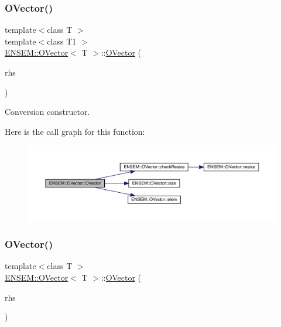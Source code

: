 \mbox{\label{classENSEM_1_1OVector_a1d68ef86b31297a79368789f7a0e43bc}} 
\subsubsection{\texorpdfstring{OVector()}{OVector()}\hspace{0.1cm}{\footnotesize\ttfamily [2/6]}}
{\footnotesize\ttfamily template$<$class T $>$ \\
template$<$class T1 $>$ \\
\mbox{\hyperlink{classENSEM_1_1OVector}{E\+N\+S\+E\+M\+::\+O\+Vector}}$<$ T $>$\+::\mbox{\hyperlink{classENSEM_1_1OVector}{O\+Vector}} (\begin{DoxyParamCaption}\item[{const \mbox{\hyperlink{classENSEM_1_1OVector}{O\+Vector}}$<$ T1 $>$ \&}]{rhs }\end{DoxyParamCaption})\hspace{0.3cm}{\ttfamily [inline]}}



Conversion constructor. 

Here is the call graph for this function\+:
\nopagebreak
\begin{figure}[H]
\begin{center}
\leavevmode
\includegraphics[width=350pt]{d0/d8d/classENSEM_1_1OVector_a1d68ef86b31297a79368789f7a0e43bc_cgraph}
\end{center}
\end{figure}
\mbox{\label{classENSEM_1_1OVector_a10129359c78668211e551f3b13829208}} 
\subsubsection{\texorpdfstring{OVector()}{OVector()}\hspace{0.1cm}{\footnotesize\ttfamily [3/6]}}
{\footnotesize\ttfamily template$<$class T $>$ \\
\mbox{\hyperlink{classENSEM_1_1OVector}{E\+N\+S\+E\+M\+::\+O\+Vector}}$<$ T $>$\+::\mbox{\hyperlink{classENSEM_1_1OVector}{O\+Vector}} (\begin{DoxyParamCaption}\item[{const \mbox{\hyperlink{classENSEM_1_1OVector}{O\+Vector}}$<$ T $>$ \&}]{rhs }\end{DoxyParamCaption})\hspace{0.3cm}{\ttfamily [inline]}}



